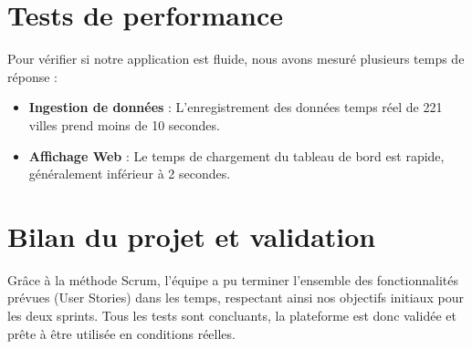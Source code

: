 \section{Tests de performance}
Pour vérifier si notre application est fluide, nous avons mesuré plusieurs temps de réponse :
\begin{itemize}
    \item \textbf{Ingestion de données} : L'enregistrement des données temps réel de 221 villes prend moins de 10 secondes.
    \item \textbf{Affichage Web} : Le temps de chargement du tableau de bord est rapide, généralement inférieur à 2 secondes.
\end{itemize}

\section{Bilan du projet et validation}
Grâce à la méthode Scrum, l'équipe a pu terminer l'ensemble des fonctionnalités prévues (User Stories) dans les temps, respectant ainsi nos objectifs initiaux pour les deux sprints. Tous les tests sont concluants, la plateforme est donc validée et prête à être utilisée en conditions réelles.
